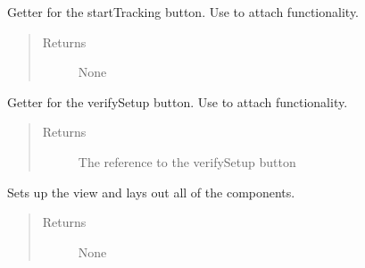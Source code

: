 \documentclass[letterpaper,10pt,english]{sphinxmanual}
\begin{document}
\begin{fulllineitems}
\begin{fulllineitems}
\begin{quote}
\begin{description}
\end{description}\end{quote}

\end{fulllineitems}


\begin{fulllineitems}
\label{\detokenize{index:src.Views.View_StartupScreen.StartupWindow.del_BtnStart}}
Getter for the startTracking button. Use to attach functionality.
\begin{quote}\begin{description}
\item[{Returns}] \leavevmode
None

\end{description}\end{quote}

\end{fulllineitems}


\begin{fulllineitems}
\label{\detokenize{index:src.Views.View_StartupScreen.StartupWindow.del_BtnVerifySetup}}
Getter for the verifySetup button. Use to attach functionality.
\begin{quote}\begin{description}
\item[{Returns}] \leavevmode
The reference to the verifySetup button

\end{description}\end{quote}

\end{fulllineitems}


\begin{fulllineitems}
\label{\detokenize{index:src.Views.View_StartupScreen.StartupWindow.initView}}
Sets up the view and lays out all of the components.
\begin{quote}\begin{description}
\item[{Returns}] \leavevmode
None


\end{description}
\end{quote}
\end{fulllineitems}
\end{fulllineitems}
\end{document}
